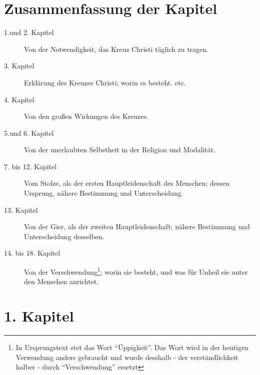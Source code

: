 
\chapter{Zusammenfassung der Kapitel}
\begin{description}
\item[1.und 2. Kapitel] Von der Notwendigkeit, das Kreuz Christi täglich zu tragen.
\item[3. Kapitel] Erklärung des Kreuzes Christi; worin es besteht. etc.
\item[4. Kapitel] Von den großen Wirkungen des Kreuzes.
\item[5.und 6. Kapitel] Von der unerlaubten Selbstheit in der Religion und Modalität.
\item[7. bis 12. Kapitel] Vom Stolze, als der ersten Hauptleidenschaft des Menschen; dessen Ursprung, nähere Bestimmung und Unterscheidung.
\item[13. Kapitel] Von der Gier, als der zweiten Hauptleidenschaft; nähere Bestimmung und Unterscheidung desselben.
\item[14. bis 18. Kapitel] Von der Verschwendung\footnote{In Ursprungstext stet das Wort "`Üppigkeit"'. Das Wort wird in der heutigen Verwendung anders gebraucht und wurde desshalb - der verständlichkeit halber - durch "`Verschwendung"' ersetzt}; worin sie besteht, und was für Unheil sie unter den Menschen anrichtet.
\end{description}

\chapter{1. Kapitel}

